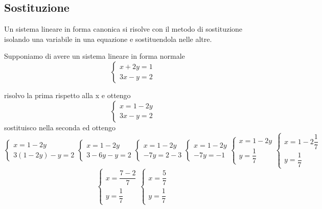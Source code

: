\subsection{Sostituzione}
\label{sec:Sostituzione}
Un sistema lineare in forma canonica si risolve con il metodo di sostituzione isolando una variabile in una equazione e sostituendola nelle altre. 
\begin{esempiot}{}{}
Supponiamo di avere un sistema lineare in forma normale
\[
\begin{cases}
	x+2y=1\\
	3x-y=2
\end{cases}
\]
\end{esempiot}
risolvo la prima rispetto alla x e ottengo 
\[
\begin{cases}
	x=1-2y\\
	3x-y=2
\end{cases}
\]
sostituisco nella seconda ed ottengo
\[
\begin{cases}
	x=1-2y\\
	3(1-2y)-y=2
\end{cases}
\begin{cases}
	x=1-2y\\
	3-6y-y=2
\end{cases}
\begin{cases}
	x=1-2y\\
	-7y=2-3
\end{cases}
\begin{cases}
	x=1-2y\\
	-7y=-1
\end{cases}
\begin{cases}
	x=1-2y\\
	y=\dfrac{1}{7}
\end{cases}
\begin{cases}
	x=1-2\dfrac{1}{7}\\
	y=\dfrac{1}{7}
\end{cases}
\]
\[
\begin{cases}
	x=\dfrac{7-2}{7} \\
	y=\dfrac{1}{7}
\end{cases}
\begin{cases}
	x=\dfrac{5}{7}\\
	y=\dfrac{1}{7}
\end{cases}
\]
